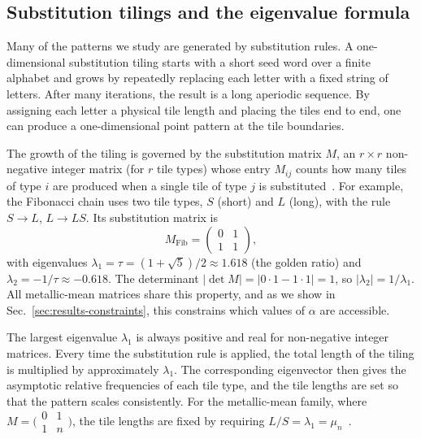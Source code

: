 \documentclass[11pt]{article}
\begin{document}
\subsection{Substitution tilings and the eigenvalue formula}
\label{sec:theory-eigenvalue}

Many of the patterns we study are generated by substitution rules. A one-dimensional substitution tiling starts with a short seed word over a finite alphabet and grows by repeatedly replacing each letter with a fixed string of letters. After many iterations, the result is a long aperiodic sequence. By assigning each letter a physical tile length and placing the tiles end to end, one can produce a one-dimensional point pattern at the tile boundaries.

The growth of the tiling is governed by the substitution matrix $M$, an $r \times r$ non-negative integer matrix (for $r$ tile types) whose entry $M_{ij}$ counts how many tiles of type $i$ are produced when a single tile of type $j$ is substituted~\cite{oguz2019substitution}. For example, the Fibonacci chain uses two tile types, $S$ (short) and $L$ (long), with the rule $S \to L$, $L \to LS$. Its substitution matrix is
\begin{equation}
 M_\text{Fib} = \begin{pmatrix} 0 & 1 \\ 1 & 1 \end{pmatrix},
 \label{eq:fibonacci-matrix}
\end{equation}
with eigenvalues $\lambda_1 = \tau = (1+\sqrt{5})/2 \approx 1.618$ (the golden ratio) and $\lambda_2 = -1/\tau \approx -0.618$. The determinant $|\det M| = |0 \cdot 1 - 1 \cdot 1| = 1$, so $|\lambda_2| = 1/\lambda_1$. All metallic-mean matrices share this property, and as we show in Sec.~\ref{sec:results-constraints}, this constrains which values of $\alpha$ are accessible.

The largest eigenvalue $\lambda_1$ is always positive and real for non-negative integer matrices. Every time the substitution rule is applied, the total length of the tiling is multiplied by approximately $\lambda_1$. The corresponding eigenvector then gives the asymptotic relative frequencies of each tile type, and the tile lengths are set so that the pattern scales consistently. For the metallic-mean family, where $M = \bigl(\begin{smallmatrix} 0 & 1 \\ 1 & n \end{smallmatrix}\bigr)$, the tile lengths are fixed by requiring $L/S = \lambda_1 = \mu_n$~\cite{oguz2019substitution}. 
\end{document}
